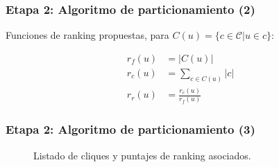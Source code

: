 \begin{frame}
\frametitle{Etapa 2: Algoritmo de particionamiento (2)}

Funciones de ranking propuestas, para $C(u) = \{c \in \mathcal{C}|u \in c\}$:

\begin{align}
	r_{f}(u) &= |C(u)| \label{eq:rankFunF}  \\ 
	r_{c}(u) &= \sum_{c \in C(u)}|c| \label{eq:rankFunC} \\ 
	r_{r}(u) &= \frac{r_{c}(u)}{r_{f}(u)} \label{eq:rankFunR}
\end{align}


\end{frame}


\begin{frame}
\frametitle{Etapa 2: Algoritmo de particionamiento (3)}

\begin{figure}
    	\centering
    	
    	\begin{minipage}{\textwidth}
    		\footnotesize
    		\centering
    		
    	\end{minipage}
    	
    	\vspace{2mm}
    \begin{minipage}{\textwidth}
    		\footnotesize
    		\centering
    		
    \end{minipage}
    
    	\caption{Listado de cliques y puntajes de ranking asociados.}
    \label{fig:rankings}
\end{figure}

\end{frame}



